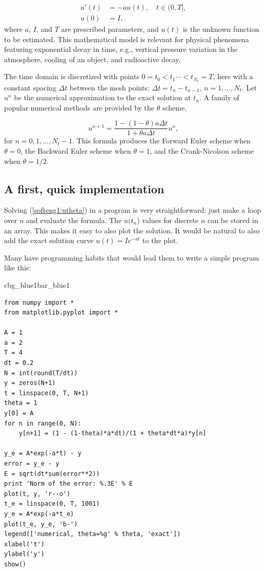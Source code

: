 \documentclass[%
oneside,                 %
final,                   %
10pt]{article}
\newenvironment{_pro_tight}[2]{
   \def\FrameCommand{\color{#2}\vrule width 1mm\normalcolor\colorbox{#1}}
   \FrameRule0.6pt\MakeFramed {\advance\hsize-2mm\FrameRestore}\vskip3mm}
   {\vskip0mm\endMakeFramed}
\newenvironment{pro}[2]{
\bgroup\rmfamily
\fboxsep=0mm\relax
\begin{_pro_tight}{#1}{#2}
\list{}{\parsep=-2mm\parskip=0mm\topsep=0pt\leftmargin=2mm
\rightmargin=2\leftmargin\leftmargin=4pt\relax}
\item\relax}
{\endlist\end{_pro_tight}\egroup}
\begin{document}
\begin{align}
u'(t) &= -au(t), \quad t \in (0,T], \label{softeng1:ode}\\ 
u(0)  &= I,                         \label{softeng1:u0}
\end{align}
where $a$, $I$, and $T$ are prescribed parameters, and $u(t)$ is
the unknown function to be estimated. This mathematical model
is relevant for physical phenomena featuring exponential decay
in time, e.g., vertical pressure variation in the atmosphere,
cooling of an object, and radioactive decay.

The
time domain is discretized with points $0 = t_0 < t_1 \cdots < t_{N_t}=T$,
here with a constant spacing $\Delta t$ between the
mesh points: $\Delta t = t_{n}-t_{n-1}$, $n=1,\ldots,N_t$. Let
$u^n$ be the numerical approximation to the exact solution at $t_n$.
A family of popular numerical methods are provided by the $\theta$ scheme,

\begin{equation}
u^{n+1} = \frac{1 - (1-\theta) a\Delta t}{1 + \theta a\Delta t}u^n,
\label{softeng1:utheta}
\end{equation}
for $n=0,1,\ldots,N_t-1$. This formula produces
the Forward Euler
scheme when $\theta=0$,
the Backward Euler
scheme when $\theta=1$,
and the Crank-Nicolson
scheme when $\theta=1/2$.


\subsection{A first, quick implementation}
\label{softeng1:basic:impl1}

Solving (\ref{softeng1:utheta}) in a program is very straightforward:
just make a loop over $n$ and evaluate the formula. The $u(t_n$)
values for discrete $n$ can be stored in an array. This makes it easy
to also plot the solution. It would be natural to also add
the exact
solution curve $u(t)=Ie^{-at}$ to the plot.

Many have programming habits that would lead them
to write a simple program like this:

\begin{pro}{cbg_blue1}{bar_blue1}\begin{Verbatim}[numbers=none,fontsize=\fontsize{9pt}{9pt},baselinestretch=0.95,xleftmargin=2mm]
from numpy import *
from matplotlib.pyplot import *

A = 1
a = 2
T = 4
dt = 0.2
N = int(round(T/dt))
y = zeros(N+1)
t = linspace(0, T, N+1)
theta = 1
y[0] = A
for n in range(0, N):
    y[n+1] = (1 - (1-theta)*a*dt)/(1 + theta*dt*a)*y[n]

y_e = A*exp(-a*t) - y
error = y_e - y
E = sqrt(dt*sum(error**2))
print 'Norm of the error: %.3E' % E
plot(t, y, 'r--o')
t_e = linspace(0, T, 1001)
y_e = A*exp(-a*t_e)
plot(t_e, y_e, 'b-')
legend(['numerical, theta=%g' % theta, 'exact'])
xlabel('t')
ylabel('y')
show()
\end{Verbatim}
\end{pro}
\noindent
\end{document}
